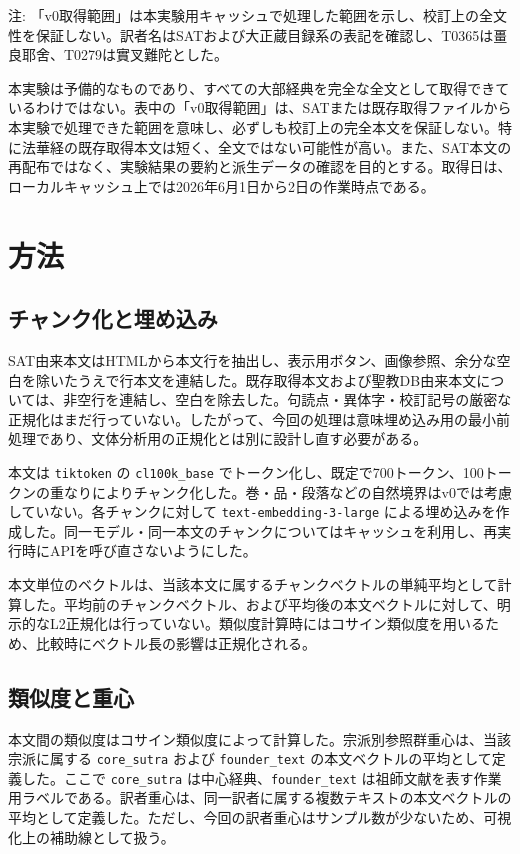\documentclass[uplatex,dvipdfmx,11pt,a4paper]{jsarticle}
\begin{document}
{\footnotesize\noindent 注: 「v0取得範囲」は本実験用キャッシュで処理した範囲を示し、校訂上の全文性を保証しない。訳者名はSATおよび大正蔵目録系の表記を確認し、T0365は畺良耶舍、T0279は實叉難陀とした。\par}

本実験は予備的なものであり、すべての大部経典を完全な全文として取得できているわけではない。表中の「v0取得範囲」は、SATまたは既存取得ファイルから本実験で処理できた範囲を意味し、必ずしも校訂上の完全本文を保証しない。特に法華経の既存取得本文は短く、全文ではない可能性が高い。また、SAT本文の再配布ではなく、実験結果の要約と派生データの確認を目的とする。取得日は、ローカルキャッシュ上では2026年6月1日から2日の作業時点である。

\section{方法}

\subsection{チャンク化と埋め込み}

SAT由来本文はHTMLから本文行を抽出し、表示用ボタン、画像参照、余分な空白を除いたうえで行本文を連結した。既存取得本文および聖教DB由来本文については、非空行を連結し、空白を除去した。句読点・異体字・校訂記号の厳密な正規化はまだ行っていない。したがって、今回の処理は意味埋め込み用の最小前処理であり、文体分析用の正規化とは別に設計し直す必要がある。

本文は \texttt{tiktoken} の \texttt{cl100k\_base} でトークン化し、既定で700トークン、100トークンの重なりによりチャンク化した。巻・品・段落などの自然境界はv0では考慮していない。各チャンクに対して \texttt{text-embedding-3-large} による埋め込みを作成した。同一モデル・同一本文のチャンクについてはキャッシュを利用し、再実行時にAPIを呼び直さないようにした。

本文単位のベクトルは、当該本文に属するチャンクベクトルの単純平均として計算した。平均前のチャンクベクトル、および平均後の本文ベクトルに対して、明示的なL2正規化は行っていない。類似度計算時にはコサイン類似度を用いるため、比較時にベクトル長の影響は正規化される。

\subsection{類似度と重心}

本文間の類似度はコサイン類似度によって計算した。宗派別参照群重心は、当該宗派に属する \texttt{core\_sutra} および \texttt{founder\_text} の本文ベクトルの平均として定義した。ここで \texttt{core\_sutra} は中心経典、\texttt{founder\_text} は祖師文献を表す作業用ラベルである。訳者重心は、同一訳者に属する複数テキストの本文ベクトルの平均として定義した。ただし、今回の訳者重心はサンプル数が少ないため、可視化上の補助線として扱う。
\end{document}
